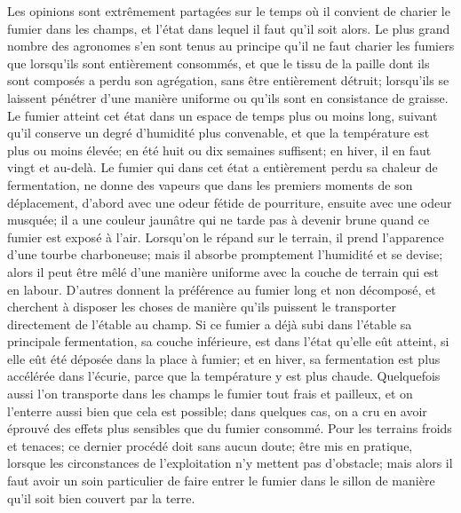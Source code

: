 Les opinions sont extrêmement partagées sur le temps où il convient de charier le fumier dans les champs, et l'état dans lequel il faut qu'il soit alors. Le plus grand nombre des agronomes s'en sont tenus au principe qu'il ne faut charier les fumiers que lorsqu'ils sont entièrement consommés, et que le tissu de la paille dont ils sont composés a perdu son agrégation, sans être entièrement détruit; lorsqu'ils se laissent pénétrer d'une manière uniforme ou qu'ils sont en consistance de graisse. Le fumier atteint cet état dans un espace de temps plus ou moins long, suivant qu'il conserve un degré d'humidité plus convenable, et que la température est plus ou moins élevée; en été huit ou dix semaines suffisent; en hiver, il en faut vingt et au-delà. Le fumier qui dans cet état a entièrement perdu sa chaleur de fermentation, ne donne des vapeurs que dans les premiers moments de son déplacement, d'abord avec une odeur fétide de pourriture, ensuite avec une odeur musquée; il a une couleur jaunâtre qui ne tarde pas à devenir brune\setcounter{page}{310} quand ce fumier est exposé à l'air. Lorsqu'on le répand sur le terrain, il prend l'apparence d'une tourbe charboneuse; mais il absorbe promptement l'humidité et se devise; alors il peut être mêlé d'une manière uniforme avec la couche de terrain qui est en labour. D'autres donnent la préférence au fumier long et non décomposé, et cherchent à disposer les choses de manière qu'ils puissent le transporter directement de l'étable au champ. Si ce fumier a déjà subi dans l'étable sa principale fermentation, sa couche inférieure, est dans l'état qu'elle eût atteint, si elle eût été déposée dans la place à fumier; et en hiver, sa fermentation est plus accélérée dans l'écurie, parce que la température y est plus chaude. Quelquefois aussi l'on transporte dans les champs le fumier tout frais et pailleux, et on l'enterre aussi bien que cela est possible; dans quelques cas, on a cru en avoir éprouvé des effets plus sensibles que du fumier consommé. Pour les terrains froids et tenaces; ce dernier procédé doit sans aucun doute; être mis en pratique, lorsque les circonstances de l'exploitation n'y mettent pas d'obstacle; mais alors il faut avoir un soin particulier de faire entrer le fumier dans le sillon de\setcounter{page}{311} manière qu'il soit bien couvert par la terre.
